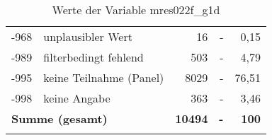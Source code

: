 \begin{longtable}{Xlrrr}
       -968 & unplausibler Wert & 16 & - & 0,15 \\

       -989 & filterbedingt fehlend & 503 & - & 4,79 \\

       -995 & keine Teilnahme (Panel) & 8029 & - & 76,51 \\

       -998 & keine Angabe & 363 & - & 3,46 \\

     \midrule
     \multicolumn{2}{l}{\textbf{Summe (gesamt)}} & \textbf{10494} & \textbf{-} & \textbf{100} \\
     \bottomrule
     \caption{Werte der Variable mres022f\_g1d}
     \end{longtable}
     
